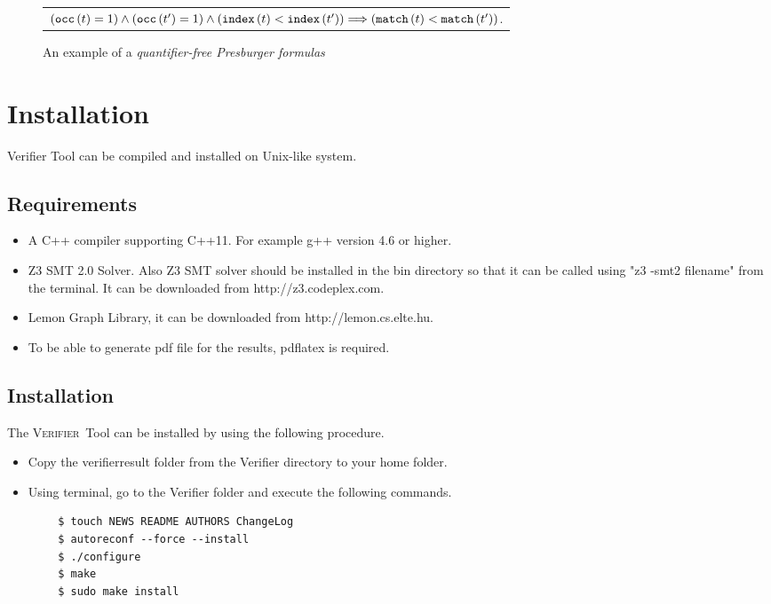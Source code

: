 \documentclass[a4paper]{article}
\newcommand{\verifier}{\textsc{Verifier}}
\newcommand{\transition}{t}
\newcommand{\occvar}{{\tt occ}}
\newcommand{\occvarof}[1]{\occvar\left({#1}\right)}
\newcommand{\indexvar}{{\tt index}}
\newcommand{\indexvarof}[1]{\indexvar\left({#1}\right)}
\newcommand{\matchingvar}{{\tt match}}
\newcommand{\matchingvarof}[1]{\matchingvar\left({#1}\right)}
\newcommand{\implies}{\Longrightarrow}
\begin{document}
\begin{figure}[h]
\begin{center}
\begin{tabular}{l@{\hspace{20pt}}}
$
\left(\occvarof{\transition}=1\right)
\wedge
\left(\occvarof{\transition'}=1\right)
\wedge
\left(\indexvarof{\transition}<\indexvarof{\transition'}\right)
\implies
\left(\matchingvarof{\transition}<\matchingvarof{\transition'}\right)
$.
\end{tabular}
\end{center}
\caption{An example of a \emph{quantifier-free Presburger formulas}}
\end{figure}

\section{Installation}
Verifier Tool can be compiled and installed on Unix-like system.
\subsection{Requirements}
\begin{itemize}
    \item A C++ compiler supporting C++11. For example g++ version 4.6 or higher.

    \item Z3 SMT 2.0 Solver. Also Z3 SMT solver should be installed in the bin directory so 
       that it can be called using "z3 -smt2 filename" from the terminal.
       It can be downloaded from http://z3.codeplex.com.

    \item Lemon Graph Library, it can be downloaded from http://lemon.cs.elte.hu.

    \item To be able to generate pdf file for the results, pdflatex is required.
\end{itemize}

\subsection{Installation}
The \verifier\ Tool can be installed by using the following procedure.
\begin{itemize}
    \item Copy the verifier\textunderscore result folder from the Verifier directory to your home folder.
    \item Using terminal, go to the Verifier folder and execute the following commands.
\end{itemize}
\begin{Verbatim}
        $ touch NEWS README AUTHORS ChangeLog
        $ autoreconf --force --install
        $ ./configure
        $ make
        $ sudo make install
\end{Verbatim}
\end{document}
